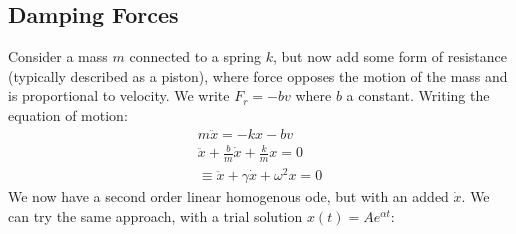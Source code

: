\documentclass[12pt]{article}
\begin{document}
\subsection{Damping Forces}
Consider a mass $m$ connected to a spring $k$, but now add some form of resistance (typically described as a piston), where force opposes the motion of the mass and is proportional to velocity. We write $F_r = - b v$ where $b$ a constant. Writing the equation of motion:
\begin{align*}
  m \ddot{x} = - kx - bv\\
  \ddot{x} + \frac{b}{m}\dot{x} + \frac{k}{m}x = 0\\
  \equiv \ddot{x} + \gamma \dot{x} + \omega^2 x=0
\end{align*}
We now have a second order linear homogenous ode, but with an added $\dot x$. We can try the same approach, with a trial solution $x(t) = A e^{\alpha t}$:
\end{document}
